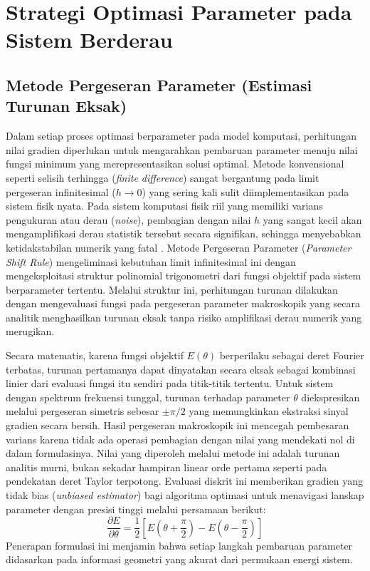 \section{Strategi Optimasi Parameter pada Sistem Berderau}

\subsection{Metode Pergeseran Parameter (Estimasi Turunan Eksak)}
Dalam setiap proses optimasi berparameter pada model komputasi, perhitungan nilai gradien diperlukan untuk mengarahkan pembaruan parameter menuju nilai fungsi minimum yang merepresentasikan solusi optimal. Metode konvensional seperti selisih terhingga (\textit{finite difference}) sangat bergantung pada limit pergeseran infinitesimal ($h \to 0$) yang sering kali sulit diimplementasikan pada sistem fisik nyata. Pada sistem komputasi fisik riil yang memiliki varians pengukuran atau derau (\textit{noise}), pembagian dengan nilai $h$ yang sangat kecil akan mengamplifikasi derau statistik tersebut secara signifikan, sehingga menyebabkan ketidakstabilan numerik yang fatal \cite{wierichs_2022}. Metode Pergeseran Parameter (\textit{Parameter Shift Rule}) mengeliminasi kebutuhan limit infinitesimal ini dengan mengeksploitasi struktur polinomial trigonometri dari fungsi objektif pada sistem berparameter tertentu. Melalui struktur ini, perhitungan turunan dilakukan dengan mengevaluasi fungsi pada pergeseran parameter makroskopik yang secara analitik menghasilkan turunan eksak tanpa risiko amplifikasi derau numerik yang merugikan.

Secara matematis, karena fungsi objektif $E(\theta)$ berperilaku sebagai deret Fourier terbatas, turunan pertamanya dapat dinyatakan secara eksak sebagai kombinasi linier dari evaluasi fungsi itu sendiri pada titik-titik tertentu. Untuk sistem dengan spektrum frekuensi tunggal, turunan terhadap parameter $\theta$ diekspresikan melalui pergeseran simetris sebesar $\pm \pi/2$ yang memungkinkan ekstraksi sinyal gradien secara bersih. Hasil pergeseran makroskopik ini mencegah pembesaran varians karena tidak ada operasi pembagian dengan nilai yang mendekati nol di dalam formulasinya. Nilai yang diperoleh melalui metode ini adalah turunan analitis murni, bukan sekadar hampiran linear orde pertama seperti pada pendekatan deret Taylor terpotong. Evaluasi diskrit ini memberikan gradien yang tidak bias (\textit{unbiased estimator}) bagi algoritma optimasi untuk menavigasi lanskap parameter dengan presisi tinggi melalui persamaan berikut:
\begin{equation}
\frac{\partial E}{\partial \theta} = \frac{1}{2} \left[ E\left(\theta + \frac{\pi}{2}\right) - E\left(\theta - \frac{\pi}{2}\right) \right]
\end{equation}
Penerapan formulasi ini menjamin bahwa setiap langkah pembaruan parameter didasarkan pada informasi geometri yang akurat dari permukaan energi sistem.

